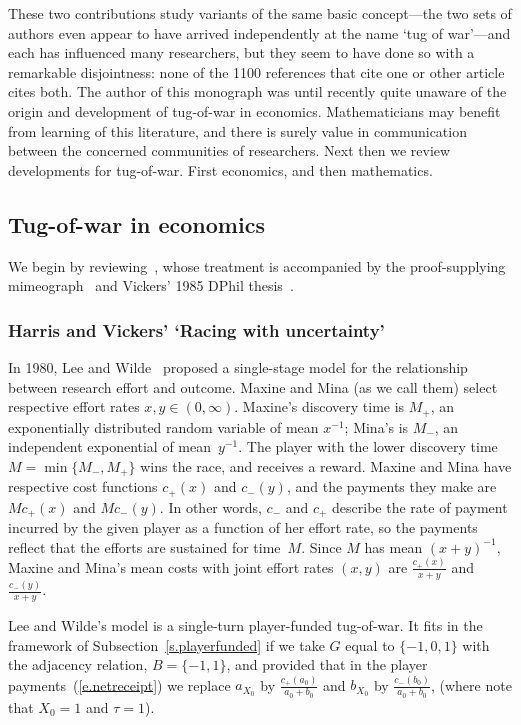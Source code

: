 \documentclass[letterpaper,11pt,oneside,reqno]{amsbook}
\numberwithin{figure}{chapter}
\theoremstyle{definition}
\theoremstyle{definition}
\theoremstyle{definition}
\theoremstyle{definition}
\theoremstyle{definition}
\begin{document}
These two contributions 
study variants of the same basic concept---the two sets of authors even appear to have arrived independently at the name `tug of war'---and  
each has influenced many researchers, but they seem to have done so with a remarkable disjointness:  none of the 1100 references that cite one or other article cites both. The author of this monograph was until recently quite unaware
of the origin and development of tug-of-war in economics. Mathematicians may benefit from learning of this literature,
and there is surely value in communication between the concerned communities of researchers.  Next then we review developments for tug-of-war. First economics, and then mathematics. 

 

 
 \subsection{Tug-of-war in economics}\label{s.economics}
 We begin by reviewing~\cite{HarrisVickers87}, whose treatment is accompanied by the proof-supplying mimeograph~\cite{HarrisVickers86} and Vickers' 1985 DPhil thesis~\cite{Vickers85}.
 
 \medskip
 
 \subsubsection{Harris and Vickers' `Racing with uncertainty'}\label{s.harrisvickers}
 In 1980, Lee and Wilde~\cite{LeeWilde} proposed a single-stage model for the relationship between research effort and outcome. Maxine and Mina  (as we call them)
 select respective effort rates $x,y \in (0,\infty)$. Maxine's discovery time is $M_+$, an exponentially distributed random variable of mean $x^{-1}$; Mina's is $M_-$, an independent exponential of mean~$y^{-1}$. The player with the lower discovery time $M = \min \{ M_-,M_+\}$ wins the race, and receives a reward.   Maxine and Mina  have respective cost functions $c_+(x)$ and $c_-(y)$, and the payments they make  are $M c_+(x)$ and $M c_-(y)$. In other words, $c_-$ and $c_+$ describe the rate of payment incurred by the given player as a function of her effort rate, so the payments reflect that the efforts are sustained for time~$M$.
 Since $M$ has mean $(x+y)^{-1}$,  Maxine and Mina's mean costs with joint effort rates $(x,y)$ are $\tfrac{c_+(x)}{x+y}$ and $\tfrac{c_-(y)}{x+y}$.
 
 Lee and Wilde's model is a single-turn player-funded tug-of-war. It fits in the framework of Subsection~\ref{s.playerfunded} if we take $G$ equal to $\{ -1,0,1\}$ with the adjacency relation, $B = \{-1,1\}$, and
 provided that in the player payments~(\ref{e.netreceipt})
 we replace $a_{X_0}$ by $\tfrac{c_+(a_0)}{a_0+b_0}$ and   $b_{X_0}$ by $\tfrac{c_-(b_0)}{a_0+b_0}$, (where note that $X_0 =1$ and $\tau =1$). 
  
\end{document}
